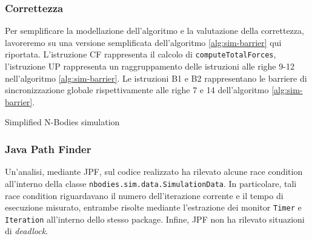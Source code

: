 \documentclass[12pt,a4paper,oneside]{article}
\begin{document}
	\subsubsection{Correttezza}
	\hfill
	\begin{minipage}{.55\textwidth}
		Per semplificare la modellazione dell'algoritmo e la valutazione della correttezza, lavoreremo su una versione semplificata dell'algoritmo \ref{alg:sim-barrier} qui riportata. L'istruzione CF rappresenta il calcolo di \texttt{computeTotalForces}, l'istruzione UP rappresenta un raggruppamento delle istruzioni alle righe 9-12 nell'algoritmo \ref{alg:sim-barrier}. Le istruzioni B1 e B2 rappresentano le barriere di sincronizzazione globale rispettivamente alle righe 7 e 14 dell'algoritmo \ref{alg:sim-barrier}.
	\end{minipage}
	\hfill
	\begin{minipage}{.4\textwidth}
		\begin{algorithm}[H]
			\caption{Simplified N-Bodies simulation}
		\end{algorithm}
	\end{minipage}
	\hfill
	
	\subsubsection{Java Path Finder}
	Un'analisi, mediante JPF, sul codice realizzato ha rilevato alcune race condition all'interno della classe \texttt{nbodies.sim.data.SimulationData}. In particolare, tali race condition riguardavano il numero dell'iterazione corrente e il tempo di esecuzione misurato, entrambe risolte mediante l'estrazione dei monitor \texttt{Timer} e \texttt{Iteration} all'interno dello stesso package. Infine, JPF non ha rilevato situazioni di \textit{deadlock}.
	
	\iffalse
\end{document}
